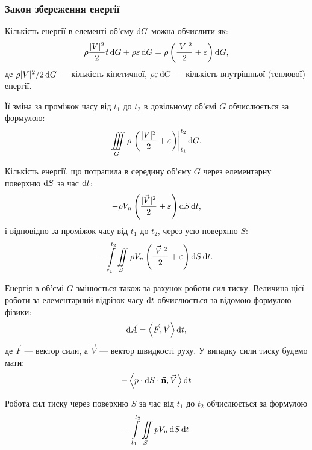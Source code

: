 \subsubsection{Закон збереження енергії}

Кількість енергії в елементі об'єму $\mathop{}\!\mathrm{d} G$ можна обчислити як:
\begin{equation}
	\rho  \frac{|V|^2}{2} t \mathop{}\!\mathrm{d} G + \rho  \varepsilon  \mathop{}\!\mathrm{d} G = \rho \left( \frac{|V|^2}{2} + \varepsilon \right) \mathop{}\!\mathrm{d} G,
\end{equation}
де $\rho  |V|^2 / 2  \mathop{}\!\mathrm{d} G$ --- кількість кінетичної, $\rho  \varepsilon  \mathop{}\!\mathrm{d} G$ --- кількість внутрішньої (теплової) енергії. \medskip

Її зміна за проміжок часу від $t_1$ до $t_2$ в довільному об'ємі $G$ обчислюється за формулою:
\begin{equation}
	\displaystyle\iiint\limits_G \rho \left. \left( \frac{|V|^2}{2} + \varepsilon \right) \right|_{t_1}^{t_2} \mathop{}\!\mathrm{d} G.
\end{equation}

Кількість енергії, що потрапила в середину об'єму $G$ через елементарну поверхню $\mathop{}\!\mathrm{d} S$ за час $\mathop{}\!\mathrm{d} t$:
\begin{equation}
	- \rho V_n \left( \frac{|\vec V|^2}{2} + \varepsilon \right) \mathop{}\!\mathrm{d} S \mathop{}\!\mathrm{d} t,
\end{equation}
і відповідно за проміжок часу від $t_1$ до $t_2$, через усю поверхню $S$:
\begin{equation}
	- \displaystyle\int\limits_{t_1}^{t_2} \displaystyle\iint\limits_S \rho V_n \left( \frac{|\vec V|^2}{2} + \varepsilon \right) \mathop{}\!\mathrm{d} S \mathop{}\!\mathrm{d} t.
\end{equation}

Енергія в об'ємі $G$ змінюється також за рахунок роботи сил тиску. Величина цієї роботи за елементарний відрізок часу $\mathop{}\!\mathrm{d} t$ обчислюється за відомою формулою фізики:
\begin{equation}
	\diff \vec A = \langle \vec F, \vec V \rangle \diff t,
\end{equation}
де $\vec F$ --- вектор сили, а $\vec V$ --- вектор швидкості руху. У випадку сили тиску будемо мати:
\begin{equation}
	- \langle p \cdot \diff S \cdot \vec{\bf{n}}, \vec V \rangle \diff t
\end{equation}

Робота сил тиску через поверхню $S$ за час від $t_1$ до $t_2$ обчислюється за формулою
\begin{equation}
	- \displaystyle\int\limits_{t_1}^{t_2} \displaystyle\iint\limits_S  p  V_n \mathop{}\!\mathrm{d} S \mathop{}\!\mathrm{d} t
\end{equation}

